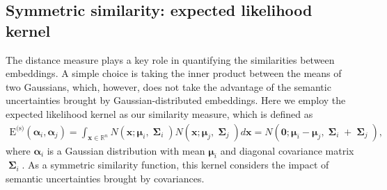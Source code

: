 \documentclass{article}
\newcommand{\xv}[0]{\ensuremath{\boldsymbol{x}} }
\newcommand{\Sigmamat}[0]{\ensuremath{\boldsymbol{\Sigma}} }
\newcommand{\muv}[0]{\ensuremath{\boldsymbol{\mu}} }
\begin{document}
\subsection{Symmetric similarity: expected likelihood kernel}\label{subsec2_1}
The distance measure plays a key role in quantifying the similarities between embeddings. A simple choice is taking the inner product between the means of two Gaussians, which, however, %
does not  take the advantage of the semantic uncertainties brought by Gaussian-distributed embeddings.
Here we employ the expected likelihood kernel \cite{jebara2004probability, vilnis2014word, athiwaratkun2018hierarchical} as our similarity measure, which is defined as
\begin{equation} \label{EL}
\begin{split}
\mbox{E} ^{\text{(s)}}\left( {{\bm{\alpha} _i},{\bm{\alpha} _j}} \right) = \int_{\xv \in {\mathbb{R}^n}} {N\left( {\xv;{\muv _i},\mathop{\Sigmamat} \nolimits_i} \right)N\left( {\xv;{\muv _j},\mathop{\Sigmamat} \nolimits_j} \right)} d\xv = N\left( {\mathbf{0};{\muv _i} - {\muv _j},\mathop{\Sigmamat} \nolimits_i + \mathop{\Sigmamat}\nolimits_j} \right) ,
\end{split}
\end{equation} where $\bm{\alpha} _i$ is a Gaussian distribution with mean ${\muv _i}$ and diagonal covariance matrix $\mathop{\Sigmamat} \nolimits_i$. As a symmetric similarity function, this kernel considers the impact of semantic uncertainties brought by covariances.  


\end{document}
